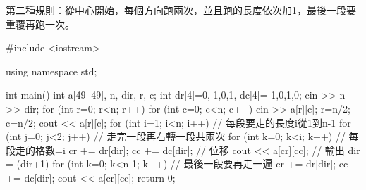 第二種規則：從中心開始，每個方向跑兩次，並且跑的長度依次加1，最後一段要重覆再跑一次。
\begin{cppcode}
#include <iostream>

using namespace std;

int main()
{
	int a[49][49], n, dir, r, c;
	int dr[4]={0,-1,0,1}, dc[4]={-1,0,1,0};
	cin >> n >> dir;
	for (int r=0; r<n; r++) {
		for (int c=0; c<n; c++) cin >> a[r][c];
	}
	r=n/2; c=n/2; cout << a[r][c];
	for (int i=1; i<n; i++) { // 每段要走的長度i從1到n-1
		for (int j=0; j<2; j++) { // 走完一段再右轉一段共兩次
			for (int k=0; k<i; k++) { // 每段走的格數=i
				cr += dr[dir];  cc += dc[dir]; // 位移
				cout << a[cr][cc]; // 輸出
			}
			dir = (dir+1) %
		}
	}
	for (int k=0; k<n-1; k++) { // 最後一段要再走一遍
		cr += dr[dir];  cc += dc[dir];
		cout << a[cr][cc];
	}
	return 0;
}
\end{cppcode}
